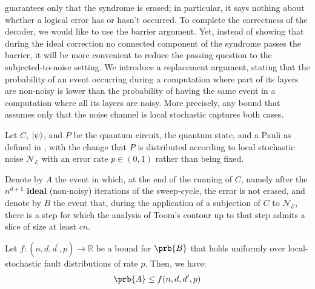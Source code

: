  guarantees only that the syndrome is erased; in particular, it says nothing about whether a logical error has or hasn't occurred. To complete the correctness of the decoder, we would like to use the barrier argument. Yet, instead of showing that during the ideal correction no connected component of the syndrome passes the barrier, it will be more convenient to reduce the passing question to the subjected-to-noise setting. We introduce a replacement argument, stating that the probability of an event occurring during a computation where part of its layers are non-noisy is lower than the probability of having the same event in a computation where all its layers are noisy. More precisely, any bound that assumes only that the noise channel is local stochastic captures both cases.
\begin{claim}
  \label{claim:replace}
  Let $C$, $\ket{\psi}$, and $P$ be the quantum circuit, the quantum state, and a Pauli as defined in , with the change that $P$ is distributed according to local stochastic noise $\mathcal{N}_{\mathcal{E}}$ with an error rate $p\in (0,1)$ rather than being fixed.

Denote by $A$ the event in which, at the end of the running of $C$, namely after the $n^{d+1}$ \textbf{ideal} (non-noisy) iterations of the sweep-cycle, the error is not erased, and denote by $B$ the event that, during the application of a subjection of $C$ to $\mathcal{N}_{\mathcal{E}}$, there is a step for which the analysis of Toom's contour up to that step admits a slice of size at least $cn$.


Let $f:(n,d,d^{\prime},p) \rightarrow \mathbb{R}$ be a bound for $\prb{B}$ that holds uniformly over local-stochastic fault distributions of rate $p$. Then, we have:
  \begin{equation}
    \label{equ:replacement}
    \begin{split}
      \prb{A} \le f(n,d,d^{\prime},p)
    \end{split}
  \end{equation}
\end{claim}
